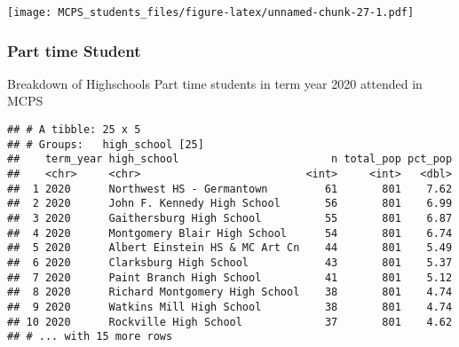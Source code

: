 \documentclass[]{article}
\newenvironment{Shaded}{\begin{snugshade}}{\end{snugshade}}
\newcommand{\DataTypeTok}[1]{\textcolor[rgb]{0.13,0.29,0.53}{#1}}
\newcommand{\DecValTok}[1]{\textcolor[rgb]{0.00,0.00,0.81}{#1}}
\newcommand{\KeywordTok}[1]{\textcolor[rgb]{0.13,0.29,0.53}{\textbf{#1}}}
\newcommand{\NormalTok}[1]{#1}
\newcommand{\OperatorTok}[1]{\textcolor[rgb]{0.81,0.36,0.00}{\textbf{#1}}}
\newcommand{\OtherTok}[1]{\textcolor[rgb]{0.56,0.35,0.01}{#1}}
\newcommand{\StringTok}[1]{\textcolor[rgb]{0.31,0.60,0.02}{#1}}
\begin{document}
\texttt{[image: MCPS\_students\_files/figure-latex/unnamed-chunk-27-1.pdf]}

\hypertarget{part-time-student}{%
\subsubsection{Part time Student}\label{part-time-student}}

Breakdown of Highschools Part time students in term year 2020 attended
in MCPS

\begin{Shaded}
\end{Shaded}

\begin{verbatim}
## # A tibble: 25 x 5
## # Groups:   high_school [25]
##    term_year high_school                        n total_pop pct_pop
##    <chr>     <chr>                          <int>     <int>   <dbl>
##  1 2020      Northwest HS - Germantown         61       801    7.62
##  2 2020      John F. Kennedy High School       56       801    6.99
##  3 2020      Gaithersburg High School          55       801    6.87
##  4 2020      Montgomery Blair High School      54       801    6.74
##  5 2020      Albert Einstein HS & MC Art Cn    44       801    5.49
##  6 2020      Clarksburg High School            43       801    5.37
##  7 2020      Paint Branch High School          41       801    5.12
##  8 2020      Richard Montgomery High School    38       801    4.74
##  9 2020      Watkins Mill High School          38       801    4.74
## 10 2020      Rockville High School             37       801    4.62
## # ... with 15 more rows
\end{verbatim}
\end{document}
